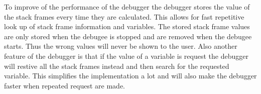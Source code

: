 To improve of the performance of the debugger the debugger stores the value of the stack frames every time they are calculated.
This allows for fast repetitive look up of stack frame information and variables.
The stored stack frame values are only stored when the \gls{debugee} is stopped and are removed when the \gls{debugee} starts.
Thus the wrong values will never be shown to the user.
Also another feature of the debugger is that if the value of a variable is request the debugger will restive all the stack frames instead and then search for the requested variable.
This simplifies the implementation a lot and will also make the debugger faster when repeated request are made.

